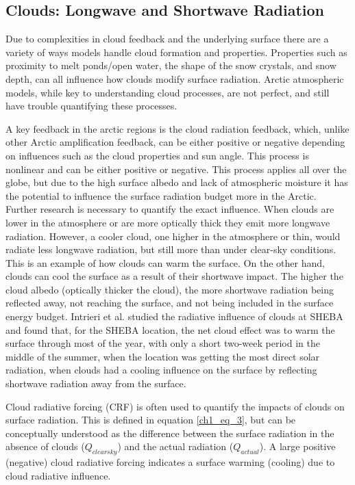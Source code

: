 \subsection{Clouds: Longwave and Shortwave Radiation}

Due to complexities in cloud feedback and the underlying surface there are a variety of ways models handle cloud formation and properties. Properties such as proximity to melt ponds/open water, the shape of the snow crystals, and snow depth, can all influence how clouds modify surface radiation. Arctic atmospheric models, while key to understanding cloud processes, are not perfect, and still have trouble quantifying these processes. 

A key feedback in the arctic regions is the cloud radiation feedback, which, unlike other Arctic amplification feedback, can be either positive or negative depending on influences such as the cloud properties and sun angle. This process is nonlinear and can be either positive or negative. This process applies all over the globe, but due to the high surface albedo and lack of atmospheric moisture it has the potential to influence the surface radiation budget more in the Arctic. Further research is necessary to quantify the exact influence. When clouds are lower in the atmosphere or are more optically thick they emit more longwave radiation. However, a cooler cloud, one higher in the atmosphere or thin, would radiate less longwave radiation, but still more than under clear-sky conditions. This is an example of how clouds can warm the surface. On the other hand, clouds can cool the surface as a result of their shortwave impact. The higher the cloud albedo (optically thicker the cloud), the more shortwave radiation being reflected away, not reaching the surface, and not being included in the surface energy budget. Intrieri et al. \cite{intrieri:2002} studied the radiative influence of clouds at SHEBA and found that, for the SHEBA location, the net cloud effect was to warm the surface through most of the year, with only a short two-week period in the middle of the summer, when the location was getting the most direct solar radiation, when clouds had a cooling influence on the surface by reflecting shortwave radiation away from the surface. 

Cloud radiative forcing (CRF) is often used to quantify the impacts of clouds on surface radiation. This is defined in equation \ref{ch1_eq_3}, but can be conceptually understood as the difference between the surface radiation in the absence of clouds ($Q_{clear sky}$) and the actual radiation ($Q_{actual}$). A large positive (negative) cloud radiative forcing indicates a surface warming (cooling) due to cloud radiative influence. 

